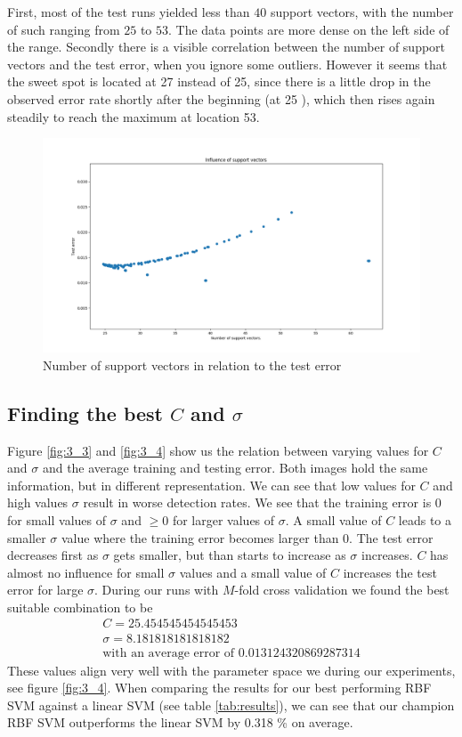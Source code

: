 First, most of the test runs yielded less than $40$ support vectors, with the number of such ranging from $25$ to $53$. The data points are more dense on the left side of the range.
Secondly there is a visible correlation between the number of support vectors and the test error, when you ignore some outliers. However it seems that the sweet spot is located at 27 instead of 25, since there is a little drop in the observed error rate shortly after the beginning (at 25 ), which then rises again steadily to reach the maximum at location 53.
\begin{figure}[h]
\begin{center}
\centering
\includegraphics[width=1\textwidth]{figures/new/3_Figure_2}
\end{center}
\caption{\label{fig:3_2} Number of support vectors in relation to the test error}
\end{figure}
\subsection{Finding the best $C$ and $\sigma$}
Figure \ref{fig:3_3} and \ref{fig:3_4} show us the relation between varying values for $C$ and $\sigma$ and the average training and testing error. Both images hold the same information, but in different representation. We can see that low values for $C$ and high values $\sigma$  result in worse detection rates. We see that the training error is 0 for small values of $\sigma$ and $\geq 0$ for larger values of $\sigma$. A small value of $C$ leads to a smaller $\sigma$ value where the training error becomes larger than 0. The test error decreases first as $\sigma$ gets smaller, but than starts to increase as $\sigma$ increases. $C$ has almost no influence for small $\sigma$ values and a small value of $C$ increases the test error for large $\sigma$.
During our runs with $M$-fold cross validation we found the best suitable combination to be 
\begin{align*}
C= 25.454545454545453\\
\sigma=8.181818181818182 \\
\text{with an average error of } 0.013124320869287314
\end{align*}
These values align very well with the parameter space we during our experiments, see figure \ref{fig:3_4}. When comparing the results for our best performing RBF SVM against a linear SVM (see table \ref{tab:results}), we can see that our champion RBF SVM outperforms the linear SVM by 0.318 \% on average.

